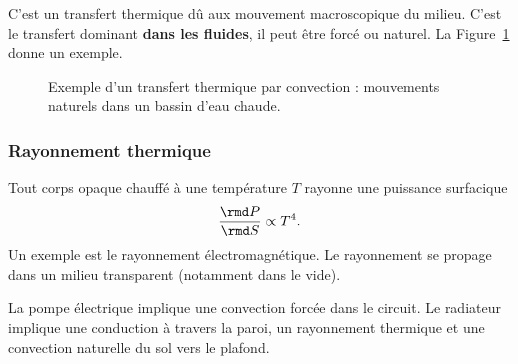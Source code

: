             C'est un transfert thermique dû aux mouvement macroscopique du milieu. C'est le transfert dominant \textbf{dans les fluides}, il peut être forcé ou naturel. La Figure~\ref{fig:exemple_transfert_thermique_convection} donne un exemple.

            \begin{figure}
                \centering
                \caption[Exemple d'un transfert thermique par convection.]{Exemple d'un transfert thermique par convection : mouvements naturels dans un bassin d'eau chaude.}
                \label{fig:exemple_transfert_thermique_convection}
            \end{figure}

        \subsubsection{Rayonnement thermique}

            Tout corps opaque chauffé à une température $T$ rayonne une puissance surfacique
            \begin{equation*}
                \frac{\rmd P}{\rmd S}\propto T^{4}.
            \end{equation*}
            Un exemple est le rayonnement électromagnétique. Le rayonnement se propage dans un milieu transparent (notamment dans le vide).

        \begin{example}
            La pompe électrique implique une convection forcée dans le circuit. Le radiateur implique une conduction à travers la paroi, un rayonnement thermique et une convection naturelle du sol vers le plafond.
        \end{example}

